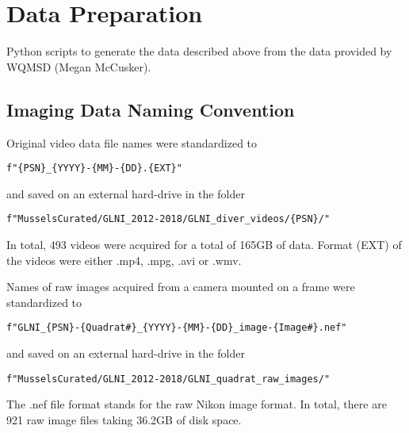 \documentclass[11pt]{article} %
\begin{document}
\section{Data Preparation}

Python scripts to generate the data described above from the data provided by WQMSD (Megan McCusker).


\subsection{Imaging Data Naming Convention}
Original video data file names were standardized to 
\begin{verbatim}
f"{PSN}_{YYYY}-{MM}-{DD}.{EXT}"
\end{verbatim} 
and saved on an external hard-drive in the folder
\begin{verbatim}
f"MusselsCurated/GLNI_2012-2018/GLNI_diver_videos/{PSN}/"
\end{verbatim} 
In total, 493 videos were acquired for a total of 165GB of data. Format (EXT) of the videos were either .mp4, .mpg, .avi or .wmv.

Names of raw images acquired from a camera mounted on a frame were standardized to
\begin{verbatim}
f"GLNI_{PSN}-{Quadrat#}_{YYYY}-{MM}-{DD}_image-{Image#}.nef"
\end{verbatim} 
and saved on an external hard-drive in the folder
\begin{verbatim}
f"MusselsCurated/GLNI_2012-2018/GLNI_quadrat_raw_images/"
\end{verbatim}
The .nef file format stands for the raw Nikon image format. In total, there are 921 raw image files taking 36.2GB of disk space.
\end{document}
